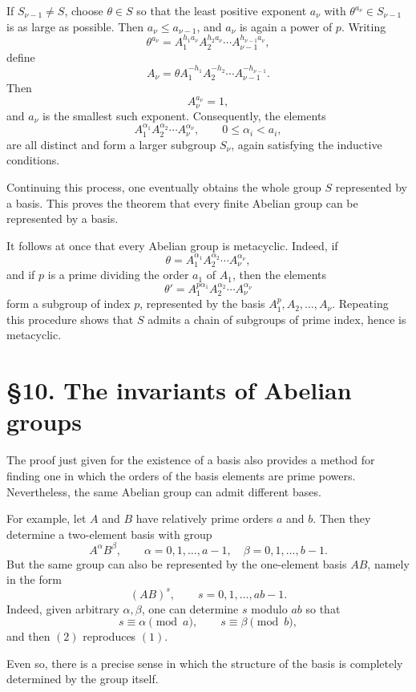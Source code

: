 \documentclass[11pt]{article}
\begin{document}
If \(S_{\nu-1}\neq S\), choose \(\theta\in S\) so that the least positive exponent \(a_\nu\) with \(\theta^{a_\nu}\in S_{\nu-1}\) is as large as possible. Then \(a_\nu\leq a_{\nu-1}\), and \(a_\nu\) is again a power of \(p\). Writing
\[
\theta^{a_\nu}=A_1^{h_1a_\nu}A_2^{h_2a_\nu}\cdots A_{\nu-1}^{h_{\nu-1}a_\nu},
\tag{17}
\]
define
\[
A_\nu=\theta A_1^{-h_1}A_2^{-h_2}\cdots A_{\nu-1}^{-h_{\nu-1}}.
\tag{18}
\]
Then
\[
A_\nu^{a_\nu}=1,
\tag{19}
\]
and \(a_\nu\) is the smallest such exponent. Consequently, the elements
\[
A_1^{\alpha_1}A_2^{\alpha_2}\cdots A_\nu^{\alpha_\nu},
\qquad
0\leq \alpha_i<a_i,
\tag{20}
\]
are all distinct and form a larger subgroup \(S_\nu\), again satisfying the inductive conditions.

Continuing this process, one eventually obtains the whole group \(S\) represented by a basis. This proves the theorem that every finite Abelian group can be represented by a basis.

It follows at once that every Abelian group is metacyclic. Indeed, if
\[
\theta=A_1^{\alpha_1}A_2^{\alpha_2}\cdots A_\nu^{\alpha_\nu},
\]
and if \(p\) is a prime dividing the order \(a_1\) of \(A_1\), then the elements
\[
\theta'=A_1^{p\alpha_1}A_2^{\alpha_2}\cdots A_\nu^{\alpha_\nu}
\]
form a subgroup of index \(p\), represented by the basis \(A_1^p,A_2,\dots,A_\nu\). Repeating this procedure shows that \(S\) admits a chain of subgroups of prime index, hence is metacyclic.

\section*{\S 10. The invariants of Abelian groups}

The proof just given for the existence of a basis also provides a method for finding one in which the orders of the basis elements are prime powers. Nevertheless, the same Abelian group can admit different bases.

For example, let \(A\) and \(B\) have relatively prime orders \(a\) and \(b\). Then they determine a two-element basis with group
\[
A^\alpha B^\beta,
\qquad
\alpha=0,1,\dots,a-1,\quad \beta=0,1,\dots,b-1.
\tag{1}
\]
But the same group can also be represented by the one-element basis \(AB\), namely in the form
\[
(AB)^s,
\qquad
s=0,1,\dots,ab-1.
\tag{2}
\]
Indeed, given arbitrary \(\alpha,\beta\), one can determine \(s\) modulo \(ab\) so that
\[
s\equiv \alpha \pmod a,\qquad s\equiv \beta \pmod b,
\]
and then \((2)\) reproduces \((1)\).

Even so, there is a precise sense in which the structure of the basis is completely determined by the group itself.
\end{document}
